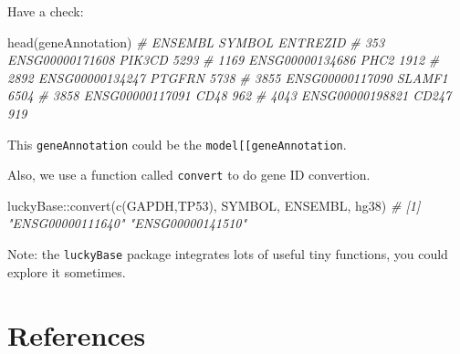 \documentclass[
  12pt,
]{book}
\newenvironment{Shaded}{\begin{snugshade}}{\end{snugshade}}
\newcommand{\CommentTok}[1]{\textcolor[rgb]{0.56,0.35,0.01}{\textit{#1}}}
\newcommand{\FunctionTok}[1]{\textcolor[rgb]{0.00,0.00,0.00}{#1}}
\newcommand{\NormalTok}[1]{#1}
\newcommand{\SpecialCharTok}[1]{\textcolor[rgb]{0.00,0.00,0.00}{#1}}
\newcommand{\StringTok}[1]{\textcolor[rgb]{0.31,0.60,0.02}{#1}}
\begin{document}
Have a check:

\begin{Shaded}
\begin{Highlighting}[]
\FunctionTok{head}\NormalTok{(geneAnnotation)}
\CommentTok{\#              ENSEMBL SYMBOL ENTREZID}
\CommentTok{\# 353  ENSG00000171608 PIK3CD     5293}
\CommentTok{\# 1169 ENSG00000134686   PHC2     1912}
\CommentTok{\# 2892 ENSG00000134247 PTGFRN     5738}
\CommentTok{\# 3855 ENSG00000117090 SLAMF1     6504}
\CommentTok{\# 3858 ENSG00000117091   CD48      962}
\CommentTok{\# 4043 ENSG00000198821  CD247      919}
\end{Highlighting}
\end{Shaded}

This \texttt{geneAnnotation} could be the \texttt{model{[}{[}\textquotesingle{}geneAnnotation\textquotesingle{}{]}{]}}.

Also, we use a function called \texttt{convert} to do gene ID convertion.

\begin{Shaded}
\begin{Highlighting}[]
\NormalTok{luckyBase}\SpecialCharTok{::}\FunctionTok{convert}\NormalTok{(}\FunctionTok{c}\NormalTok{(}\StringTok{\textquotesingle{}GAPDH\textquotesingle{}}\NormalTok{,}\StringTok{\textquotesingle{}TP53\textquotesingle{}}\NormalTok{), }\StringTok{\textquotesingle{}SYMBOL\textquotesingle{}}\NormalTok{, }\StringTok{\textquotesingle{}ENSEMBL\textquotesingle{}}\NormalTok{, hg38)}
\CommentTok{\# [1] "ENSG00000111640" "ENSG00000141510"}
\end{Highlighting}
\end{Shaded}

Note: the \texttt{luckyBase} package integrates lots of useful tiny functions, you could explore it sometimes.

\hypertarget{references}{%
\chapter*{References}\label{references}}
\end{document}
